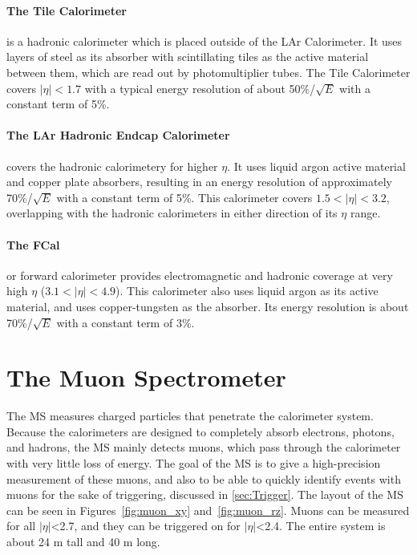 \paragraph{The Tile Calorimeter} is a hadronic calorimeter which is placed outside of the LAr Calorimeter. It uses layers of steel as its absorber with scintillating tiles as the active material between them, which are read out by photomultiplier tubes. The Tile Calorimeter covers $|\eta| < 1.7$ with a typical energy resolution of about 50\%/$\sqrt{E}$ with a constant term of 5\%. 

\paragraph{The LAr Hadronic Endcap Calorimeter} covers the hadronic calorimetery for higher $\eta$. It uses liquid argon active material and copper plate absorbers, resulting in an energy resolution of approximately 70\%/$\sqrt{E}$ with a constant term of 5\%. This calorimeter covers $1.5 < |\eta| < 3.2$, overlapping with the hadronic calorimeters in either direction of its $\eta$ range. 

\paragraph{The FCal} or forward calorimeter provides electromagnetic and hadronic coverage at very high $\eta$ ($3.1 < |\eta| < 4.9$). This calorimeter also uses liquid argon as its active material, and uses copper-tungsten as the absorber. Its energy resolution is about 70\%/$\sqrt{E}$ with a constant term of 3\%.

\section{The Muon Spectrometer}
\label{sec:MS}

The \acf{MS} measures charged particles that penetrate the calorimeter system. Because the calorimeters are designed to completely absorb electrons, photons, and hadrons, the \ac{MS} mainly detects muons, which pass through the calorimeter with very little loss of energy. The goal of the \ac{MS} is to give a high-precision measurement of these muons, and also to be able to quickly identify events with muons for the sake of triggering, discussed in \autoref{sec:Trigger}. The layout of the \ac{MS} can be seen in Figures~\ref{fig:muon_xy} and~\ref{fig:muon_rz}. Muons can be measured for all $|\eta|$<2.7, and they can be triggered on for $|\eta|$<2.4. The entire system is about 24 m tall and 40 m long. 

